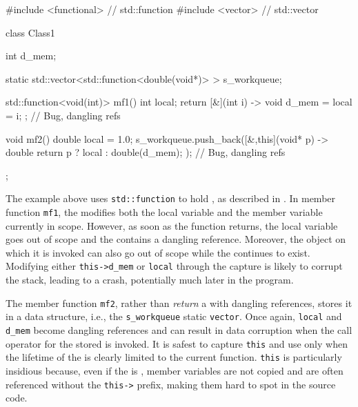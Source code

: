 \begin{emcppslisting}
#include <functional>  // std::function
#include <vector>      // std::vector

class Class1
{
    int d_mem;

    static std::vector<std::function<double(void*)> > s_workqueue;

    std::function<void(int)> mf1()
    {
        int local;
        return [&](int i) -> void { d_mem = local = i; };  // Bug, dangling refs
    }

    void mf2()
    {
        double local = 1.0;
        s_workqueue.push_back([&,this](void* p) -> double {
                return p ? local : double(d_mem);
            });  // Bug, dangling refs
    }
};
\end{emcppslisting}
    

The example above uses \lstinline!std::function! to hold , as described in . In member
function \lstinline!mf1!, the  modifies both the local
variable and the member variable currently in scope. However, as soon as
the function returns, the local variable goes out of scope and the
 contains a dangling reference. Moreover, the object on
which it is invoked can also go out of scope while the  continues to exist. Modifying either \lstinline!this->d_mem! or
\lstinline!local! through the capture is likely to corrupt the stack,
leading to a crash, potentially much later in the program.

The member function \lstinline!mf2!, rather than \emph{return} a
 with dangling references, stores it in a data
structure, i.e., the \lstinline!s_workqueue! static \lstinline!vector!. Once
again, \lstinline!local! and \lstinline!d_mem! become dangling references and
can result in data corruption when the call operator for the stored
 is invoked. It is safest to capture
\lstinline!this! and use  only when the
lifetime of the  is clearly limited to the
current function.  \lstinline!this! is
particularly insidious because, even if the  is
, member variables are not copied and are often
referenced without the \lstinline!this->! prefix, making them hard to spot
in the source code.

